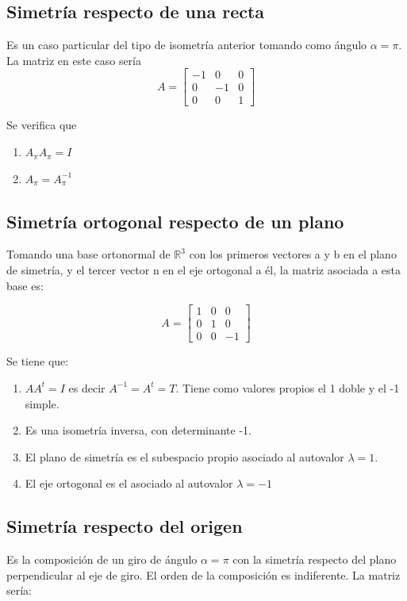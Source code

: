 \documentclass[10pt,a4paper]{article}
\theoremstyle{mystyle}
\begin{document}
\subsection{Simetría respecto de una recta}

Es un caso particular del tipo de isometría anterior tomando como ángulo $\alpha = \pi$. La matriz en este caso sería  
\[
A=
\begin{bmatrix}
-1 & 0 & 0 \\
0 &  -1  & 0 \\
0 & 0 & 1
\end{bmatrix}
\]


Se verifica que 

\begin{enumerate}
	\item
	$ A_\pi A_\pi = I $
	\item
	$ A_\pi = A_{\pi}^{-1} $
		
\end{enumerate}

\subsection{Simetría ortogonal respecto de un plano}

Tomando una base ortonormal de $\mathbb{R}^3$ con los primeros vectores a y b en el plano de simetría, y el tercer vector n en el eje ortogonal a él, la matriz asociada a esta base es:

\[
A=
\begin{bmatrix}
1 & 0 & 0 \\
0 &  1  & 0 \\
0 & 0 & -1
\end{bmatrix}
\]

Se tiene que:

\begin{enumerate}
\item $AA^{t} = I$ es decir $A^{-1} = A^{t} = T$. Tiene como valores propios el 1 doble y el -1 simple.
\item Es una isometría inversa, con determinante -1.
\item El plano de simetría es el subespacio propio asociado al autovalor $\lambda = 1$.
\item El eje ortogonal es el asociado al autovalor $\lambda = -1$
\end{enumerate}

\subsection{Simetría respecto del origen}
Es la composición de un giro de ángulo $\alpha = \pi$ con la simetría respecto del plano perpendicular al eje de giro. El orden de la composición es indiferente.
La matriz sería:
\end{document}
